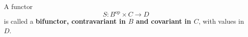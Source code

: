 A functor
$$S: B^{\mathrm{op}} \times C \to D$$
is called a \textbf{bifunctor, contravariant in $B$ and covariant in $C$}, with values in $D$.
